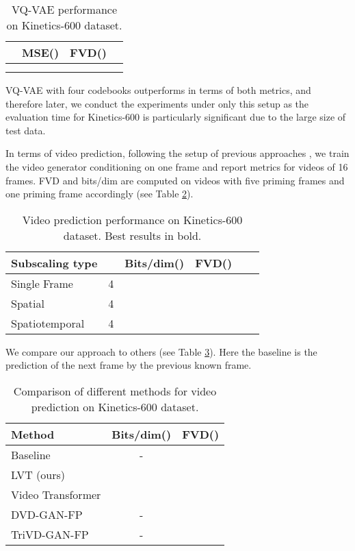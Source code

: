\documentclass{article}
\begin{document}
\begin{table}[!hbtp]
\centering
\caption{VQ-VAE performance on Kinetics-600 dataset.}
\begin{tabular}{lccc}
\hline
 & \textbf{MSE}() & \textbf{FVD()}     \\ \hline
 &  &  \\
 &  &  \\\hline
\end{tabular}
\label{table:kinvqvae}
\end{table}

VQ-VAE with four codebooks outperforms in terms of both metrics, and therefore later, we conduct the experiments under only this setup as the evaluation time for Kinetics-600 is particularly significant due to the large size of test data.

In terms of video prediction, following the setup of previous approaches \cite{vt, dvdgan, dvdgan2}, we train the video generator conditioning on one frame and report metrics for videos of 16 frames. FVD and bits/dim are computed on videos with five priming frames and one priming frame accordingly (see Table \ref{table:kinvt}).

\begin{table}[!hbtp]
\centering
\caption{Video prediction performance on Kinetics-600 dataset. Best results in bold.}
\begin{tabular}{lllccc}
\hline
\textbf{Subscaling type} &  & \textbf{Bits/dim}() & \textbf{FVD}() \\ \hline
Single Frame & 4 &  &  \\
Spatial & 4 &   &              \\
Spatiotemporal & 4 &  &  \\ \hline
\end{tabular}
\label{table:kinvt}
\end{table}

We compare our approach to others (see Table \ref{table:kinbench}). Here the baseline is the prediction of the next frame by the previous known frame.



\begin{table}[!hbtp]
\centering
\caption{Comparison of different methods for video prediction on Kinetics-600 dataset.}
\begin{tabular}{lcc}
\hline
\textbf{Method} & \textbf{Bits/dim}()  & \textbf{FVD}()     \\ \hline
Baseline & - &  \\
LVT (ours) &  &  \\
Video Transformer \cite{vt} &  &  \\
DVD-GAN-FP \cite{dvdgan} & - &    \\
TriVD-GAN-FP \cite{dvdgan2} & - &  \\ \hline
\end{tabular}
\label{table:kinbench}
\end{table}
\end{document}
